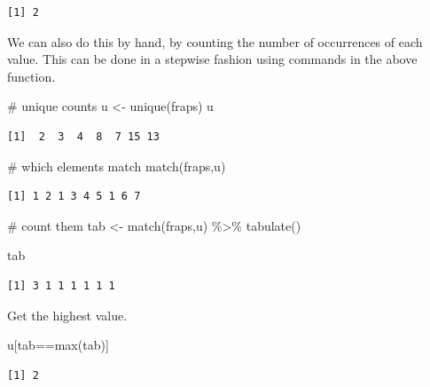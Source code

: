 \documentclass[
  letterpaper,
  DIV=11,
  numbers=noendperiod]{scrreprt}
\newenvironment{Shaded}{\begin{snugshade}}{\end{snugshade}}
\newcommand{\CommentTok}[1]{\textcolor[rgb]{0.37,0.37,0.37}{#1}}
\newcommand{\FunctionTok}[1]{\textcolor[rgb]{0.28,0.35,0.67}{#1}}
\newcommand{\NormalTok}[1]{\textcolor[rgb]{0.00,0.23,0.31}{#1}}
\newcommand{\OtherTok}[1]{\textcolor[rgb]{0.00,0.23,0.31}{#1}}
\newcommand{\SpecialCharTok}[1]{\textcolor[rgb]{0.37,0.37,0.37}{#1}}
\begin{document}
\begin{verbatim}
[1] 2
\end{verbatim}

We can also do this by hand, by counting the number of occurrences of
each value. This can be done in a stepwise fashion using commands in the
above function.

\begin{Shaded}
\begin{Highlighting}[]
\CommentTok{\# unique counts}
\NormalTok{u }\OtherTok{\textless{}{-}} \FunctionTok{unique}\NormalTok{(fraps)}
\NormalTok{u}
\end{Highlighting}
\end{Shaded}

\begin{verbatim}
[1]  2  3  4  8  7 15 13
\end{verbatim}

\begin{Shaded}
\begin{Highlighting}[]
\CommentTok{\# which elements match}
\FunctionTok{match}\NormalTok{(fraps,u)}
\end{Highlighting}
\end{Shaded}

\begin{verbatim}
[1] 1 2 1 3 4 5 1 6 7
\end{verbatim}

\begin{Shaded}
\begin{Highlighting}[]
\CommentTok{\# count them}
\NormalTok{tab }\OtherTok{\textless{}{-}} \FunctionTok{match}\NormalTok{(fraps,u) }\SpecialCharTok{\%\textgreater{}\%}
  \FunctionTok{tabulate}\NormalTok{()}

\NormalTok{tab}
\end{Highlighting}
\end{Shaded}

\begin{verbatim}
[1] 3 1 1 1 1 1 1
\end{verbatim}

Get the highest value.

\begin{Shaded}
\begin{Highlighting}[]
\NormalTok{u[tab}\SpecialCharTok{==}\FunctionTok{max}\NormalTok{(tab)]}
\end{Highlighting}
\end{Shaded}

\begin{verbatim}
[1] 2
\end{verbatim}
\end{document}
